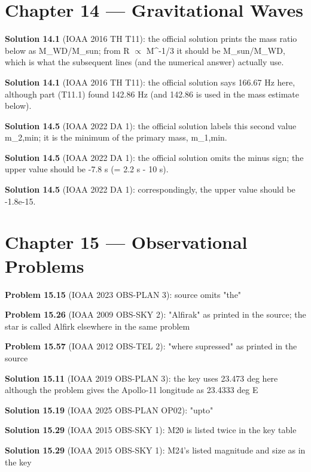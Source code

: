 \section*{Chapter 14 --- Gravitational Waves}

\noindent\textbf{Solution 14.1} (IOAA 2016 TH T11): the official solution prints the mass ratio below as M\_WD/M\_sun; from R $\propto$ M\^{}{-1/3} it should be M\_sun/M\_WD, which is what the subsequent lines (and the numerical answer) actually use.
\smallskip

\noindent\textbf{Solution 14.1} (IOAA 2016 TH T11): the official solution says 166.67 Hz here, although part (T11.1) found 142.86 Hz (and 142.86 is used in the mass estimate below).
\smallskip

\noindent\textbf{Solution 14.5} (IOAA 2022 DA 1): the official solution labels this second value m\_{2,min}; it is the minimum of the primary mass, m\_{1,min}.
\smallskip

\noindent\textbf{Solution 14.5} (IOAA 2022 DA 1): the official solution omits the minus sign; the upper value should be -7.8 s (= 2.2 s - 10 s).
\smallskip

\noindent\textbf{Solution 14.5} (IOAA 2022 DA 1): correspondingly, the upper value should be -1.8e-15.
\smallskip

\section*{Chapter 15 --- Observational Problems}

\noindent\textbf{Problem 15.15} (IOAA 2023 OBS-PLAN 3): source omits "the"
\smallskip

\noindent\textbf{Problem 15.26} (IOAA 2009 OBS-SKY 2): "Alfirak" as printed in the source; the star is called Alfirk elsewhere in the same problem
\smallskip

\noindent\textbf{Problem 15.57} (IOAA 2012 OBS-TEL 2): "where supressed" as printed in the source
\smallskip

\noindent\textbf{Solution 15.11} (IOAA 2019 OBS-PLAN 3): the key uses 23.473 deg here although the problem gives the Apollo-11 longitude as 23.4333 deg E
\smallskip

\noindent\textbf{Solution 15.19} (IOAA 2025 OBS-PLAN OP02): "upto"
\smallskip

\noindent\textbf{Solution 15.29} (IOAA 2015 OBS-SKY 1): M20 is listed twice in the key table
\smallskip

\noindent\textbf{Solution 15.29} (IOAA 2015 OBS-SKY 1): M24's listed magnitude and size as in the key
\smallskip

